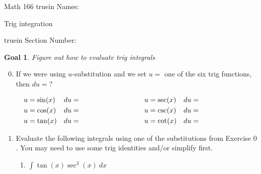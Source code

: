 \documentclass[12pt]{article}
\newtheorem*{goal}{Goal}
\begin{document}
\pagestyle{empty} %

\noindent
{Math 166   truein  Names:\ \hrulefill}

\noindent
{Trig integration}

\noindent  {} truein  Section Number:\ \hrulefill
\smallskip

\begin{goal} \rm
Figure out how to evaluate trig integrals 
\end{goal}


\begin{enumerate}
\setcounter{enumi}{-1}


\item If we were using $u$-substitution and we set $u=$ one of the six trig functions, then $du=$? 

\noindent
\begin{align*}
u &= \sin (x)  &du= \hspace{1.25in} u &= \sec (x) &du = \hspace{1in}\\
u &= \cos (x)  &du= \hspace{1.25in} u &= \csc (x) &du = \hspace{1in}\\
u &= \tan (x)  &du= \hspace{1.25in} u &= \cot (x) &du = \hspace{1in}\\
\end{align*}

\item Evaluate the following integrals using one of the substitutions from Exercise $0$. You may need to use some trig identities and/or simplify first.
\begin{enumerate}
\item $\displaystyle\int  \tan (x) \sec^3 (x) \ dx$


\end{enumerate}
\end{enumerate}
\end{document}

